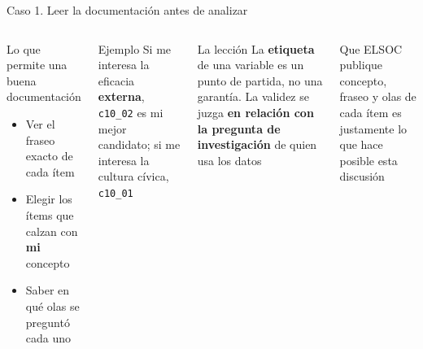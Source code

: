 \documentclass[aspectratio=169,11pt]{beamer}
\newcommand{\hlr}[1]{\textcolor{acero}{\textbf{#1}}}        %
\newcommand{\code}[1]{\texttt{\small #1}}                    %
\begin{document}
\begin{frame}{Caso 1. Leer la documentación antes de analizar}
\begin{columns}[T]
\begin{exampleblock}{Lo que permite una buena documentación}
\small
\begin{itemize}
  \item Ver el fraseo exacto de cada ítem
  \item Elegir los ítems que calzan con \textbf{mi} concepto
  \item Saber en qué olas se preguntó cada uno
\end{itemize}
\end{exampleblock}
\bigskip
\begin{block}{Ejemplo}
\small
Si me interesa la eficacia \textbf{externa}, \code{c10\_02} es mi mejor candidato; si me interesa la cultura cívica, \code{c10\_01}
\end{block}
\begin{alertblock}{La lección}
\small
La \hlr{etiqueta} de una variable es un punto de partida, no una garantía. La validez se juzga \textbf{en relación con la pregunta de investigación} de quien usa los datos
\end{alertblock}
\bigskip
\small
Que ELSOC publique concepto, fraseo y olas de cada ítem es justamente lo que hace posible esta discusión
\end{columns}
\end{frame}
\end{document}
